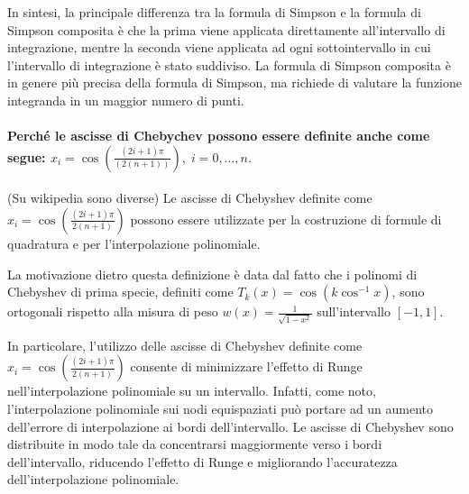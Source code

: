 In sintesi, la principale differenza tra la formula di Simpson e la formula di Simpson composita è che la prima viene applicata direttamente all'intervallo di integrazione, mentre la seconda viene applicata ad ogni sottointervallo in cui l'intervallo di integrazione è stato suddiviso. La formula di Simpson composita è in genere più precisa della formula di Simpson, ma richiede di valutare la funzione integranda in un maggior numero di punti.

\paragraph{Perché le ascisse di Chebychev possono essere definite anche come segue: $x_i=\cos(\frac{(2i+1)\pi}{(2(n+1))}),\; i=0,\hdots,n.$}

\noindent (Su wikipedia sono diverse) Le ascisse di Chebyshev definite come $x_i=\cos(\frac{(2i+1)\pi}{2(n+1)})$ possono essere utilizzate per la costruzione di formule di quadratura e per l'interpolazione polinomiale.

\noindent La motivazione dietro questa definizione è data dal fatto che i polinomi di Chebyshev di prima specie, definiti come $T_k(x)=\cos(k\cos^{-1} x)$, sono ortogonali rispetto alla misura di peso $w(x)=\frac{1}{\sqrt{1-x^2}}$ sull'intervallo $[-1,1]$.

\noindent In particolare, l'utilizzo delle ascisse di Chebyshev definite come $x_i=\cos\left(\frac{(2i+1)\pi}{2(n+1)}\right)$ consente di minimizzare l'effetto di Runge nell'interpolazione polinomiale su un intervallo. Infatti, come noto, l'interpolazione polinomiale sui nodi equispaziati può portare ad un aumento dell'errore di interpolazione ai bordi dell'intervallo. Le ascisse di Chebyshev sono distribuite in modo tale da concentrarsi maggiormente verso i bordi dell'intervallo, riducendo l'effetto di Runge e migliorando l'accuratezza dell'interpolazione polinomiale.